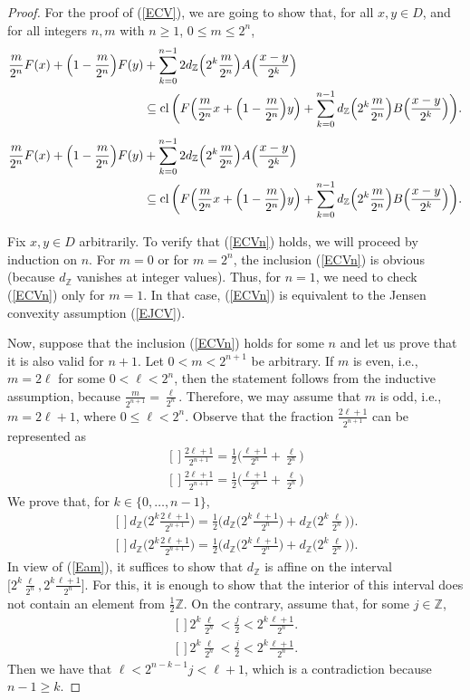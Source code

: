 \documentclass[12pt,reqno]{amsart}
\newcommand{\Z}{\mathbb{Z}}
\newcommand{\cl}{\mathop{\hbox{\rm cl}}\nolimits}
\theoremstyle{definition}
\def\eq#1{{\rm(\ref{E#1})}}
\def\Eq#1#2{\ifthenelse{\equal{#1}{*}}
  {\begin{equation*}\begin{aligned}[]#2\end{aligned}\end{equation*}}
  {\begin{equation}\begin{aligned}[]\label{E#1}#2\end{aligned}\end{equation}}}
\begin{document}
\begin{proof} For the proof of \eq{CV}, we are going to show that, for all $x,y\in D$,
and for all integers $n,m$ with $n\geq 1$, $0\leq m\leq 2^n$,
\Eq{CVn}{
 \frac{m}{2^n}F(x)+\Big(1-\frac{m}{2^n}\Big)F(y) 
  &+ \sum_{k=0}^{n-1}2 d_{\Z}\Big(2^k \frac{m}{2^n}\Big)A\Big(\dfrac{x-y}{2^k}\Big) \\
 &\subseteq \cl\bigg(F\Big(\frac{m}{2^n}x+\Big(1-\frac{m}{2^n}\Big)y\Big) 
   + \sum_{k=0}^{n-1}d_{\Z}\Big(2^k \frac{m}{2^n}\Big)B\Big(\dfrac{x-y}{2^k}\Big)\bigg). 
}

Fix $x,y\in D$ arbitrarily. To verify that \eq{CVn} holds, we will proceed by induction on $n$. 
For $m=0$ or for $m=2^n$, the inclusion \eq{CVn} is obvious (because $d_\Z$ vanishes at integer
values). Thus, for $n=1$, we need to check \eq{CVn} only for $m=1$. In that case, \eq{CVn} is
equivalent to the Jensen convexity assumption \eq{JCV}.

Now, suppose that the inclusion \eq{CVn} holds for some $n$ and let us prove that it is also valid for
$n+1$. Let $0<m<2^{n+1}$ be arbitrary. If $m$ is even, i.e., $m=2\ell$ for some $0<\ell<2^n$, then
the statement follows from the inductive assumption, because $\frac{m}{2^{n+1}}=\frac{\ell}{2^n}$.
Therefore, we may assume that $m$ is odd, i.e., $m=2\ell+1$, where $0\leq \ell<2^n$.
Observe that the fraction $\frac{2\ell+1}{2^{n+1}}$ can be represented as
\Eq{am}{
   \frac{2\ell+1}{2^{n+1}}=\frac12\Big(\frac{\ell+1}{2^{n}}+\frac{\ell}{2^{n}}\Big)
}
We prove that, for $k\in\{0,\dots,n-1\}$,
\Eq{JCd}{
   d_\Z\Big(2^k\frac{2\ell+1}{2^{n+1}}\Big)
    =\frac12\Big(d_\Z\Big(2^k\frac{\ell+1}{2^{n}}\Big)+d_\Z\Big(2^k\frac{\ell}{2^{n}}\Big)\Big).
}
In view of \eq{am}, it suffices to show that $d_\Z$ is affine on the interval 
$\Big[2^k\frac{\ell}{2^{n}},2^k\frac{\ell+1}{2^{n}}\Big]$. For this, it is enough to show
that the interior of this interval does not contain an element from $\frac12\Z$. On the contrary,
assume that, for some $j\in\Z$,
\Eq{*}{
   2^k\frac{\ell}{2^{n}}<\frac{j}2<2^k\frac{\ell+1}{2^{n}}.
}
Then we have that $\ell<2^{n-k-1}j<\ell+1$, which is a contradiction because $n-1\geq k$. 


\end{proof}
\end{document}
